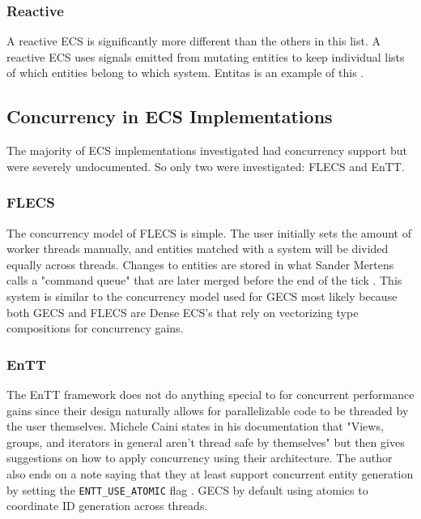 \subsubsection{Reactive}
A reactive ECS is significantly more different than the others in this list. A reactive ECS uses signals emitted from mutating entities to keep individual lists of which entities belong to which system. Entitas is an example of this \cite{SanderMertensECS}.

\subsection{Concurrency in ECS Implementations}
The majority of ECS implementations investigated had concurrency support but were severely undocumented. So only two were investigated: FLECS and EnTT.

\subsubsection{FLECS}
The concurrency model of FLECS is simple. The user initially sets the amount of worker threads manually, and entities matched with a system will be divided equally across threads. Changes to entities are stored in what Sander Mertens calls a "command queue" that are later merged before the end of the tick \cite{missing_docs}. This system is similar to the concurrency model used for GECS most likely because both GECS and FLECS are Dense ECS's that rely on vectorizing type compositions for concurrency gains.

\subsubsection{EnTT}
The EnTT framework does not do anything special to for concurrent performance gains since their design naturally allows for parallelizable code to be threaded by the user themselves. Michele Caini states in his documentation that "Views, groups, and iterators in general aren't thread safe by themselves" but then gives suggestions on how to apply concurrency using their architecture. The author also ends on a note saying that they at least support concurrent entity generation by setting the \texttt{ENTT\_USE\_ATOMIC} flag \cite{EnTT_multithreading}. GECS by default using atomics to coordinate ID generation across threads.